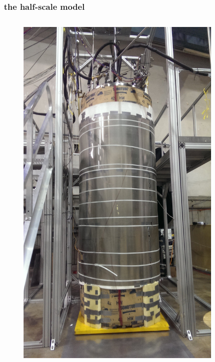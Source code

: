 \documentclass{beamer}
\begin{document}
\begin{frame}
\frametitle{the half-scale model}

    \begin{columns}
    
    \begin{column}{0.5\textwidth}
    \begin{figure}
    \includegraphics[width=0.9\textwidth]
    {figures/lab_picture.jpg}
    \end{figure}
    \end{column}
    

\end{columns}
\end{frame}
\end{document}
